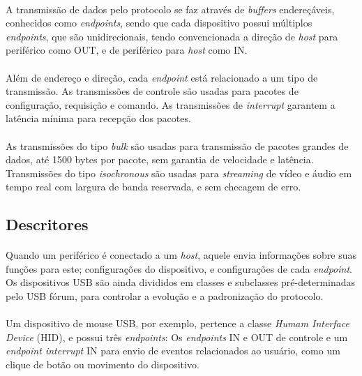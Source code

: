 \paragraph{}A transmissão de dados pelo protocolo se faz através de \textit{buffers} endereçáveis, conhecidos como \textit{endpoints}, sendo que cada dispositivo possui múltiplos \textit{endpoints}, que são unidirecionais, tendo convencionada a direção de \textit{host} para periférico como OUT, e de periférico para \textit{host} como IN.

\paragraph{}Além de endereço e direção, cada \textit{endpoint} está relacionado a um tipo de transmissão. As transmissões de controle são usadas para pacotes de configuração, requisição e comando. As transmissões de \textit{interrupt} garantem a latência mínima para recepção dos pacotes.

\paragraph{}As transmissões do tipo \textit{bulk} são usadas para transmissão de pacotes grandes de dados, até 1500 bytes por pacote, sem garantia de velocidade e latência. Transmissões do tipo \textit{isochronous} são usadas para \textit{streaming} de vídeo e áudio em tempo real com largura de banda reservada, e sem checagem de erro.

\subsection{Descritores}

\paragraph{}Quando um periférico é conectado a um \textit{host}, aquele envia informações sobre suas funções para este; configurações do dispositivo, e configurações de cada \textit{endpoint}. Os dispositivos USB são ainda divididos em classes e subclasses pré-determinadas pelo USB fórum, para controlar a evolução e a padronização do protocolo.

\paragraph{}Um dispositivo de mouse USB, por exemplo, pertence a classe \textit{Humam Interface Device} (HID), e possui três \textit{endpoints}: Os \textit{endpoints} IN e OUT de controle e um \textit{endpoint interrupt} IN para envio de eventos relacionados ao usuário, como um clique de botão ou movimento do dispositivo.

